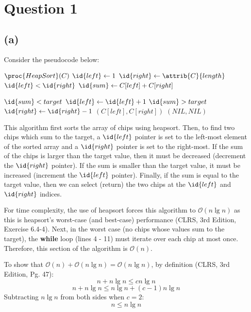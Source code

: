 \section{Question 1}
    \subsection{(a)}
    Consider the pseudocode below:
    \begin{spacing}{1.2}
    \begin{codebox}
        \li $\proc{HeapSort}(C)$
        \li $\id{left} \gets 1$
        \li $\id{right} \gets \attrib{C}{length}$
        \li \While $\id{left} < \id{right}$
            \Do
                \li $\id{sum} \gets C[left] + C[right]$

                \li \If $\id{sum} < target$
                \Then
                    \li $\id{left} \gets \id{left} + 1$
                \li \ElseIf $\id{sum} > target$
                \Then
                    \li $\id{right} \gets \id{right} - 1$
                \li \ElseNoIf
                    \li \Return $(C[left], C[right])$
                \End 
            \End
        \li \Return $(NIL, NIL)$
    \end{codebox}
    \end{spacing}
    \vspace{5mm}
    This algorithm first sorts the array of chips using heapsort. 
    Then, to find two chips which sum to the target, a $\id{left}$ pointer is set to the left-most element of the sorted array and a $\id{right}$ pointer is set to the right-most.
    If the sum of the chips is larger than the target value, then it must be decreased (decrement the $\id{right}$ pointer).
    If the sum is smaller than the target value, it must be increased (increment the $\id{left}$ pointer).
    Finally, if the sum is equal to the target value, then we can select (return) the two chips at the $\id{left}$ and $\id{right}$ indices.

    For time complexity, the use of heapsort forces this algorithm to $\mathcal{O}(n\lg{n})$ as this is heapsort's worst-case (and best-case) performance (CLRS, 3rd Edition, Exercise 6.4-4).
    Next, in the worst case (no chips whose values sum to the target), the \textbf{while} loop (lines 4 - 11) must iterate over each chip at most once.
    Therefore, this section of the algorithm is $\mathcal{O}(n)$.

    To show that $\mathcal{O}(n) + \mathcal{O}(n\lg{n}) = \mathcal{O}(n\lg{n})$, by definition (CLRS, 3rd Edition, Pg. 47):
    \[n + n\lg{n} \le cn\lg{n}\]
    \[n + n\lg{n} \le n\lg{n} + (c-1)n\lg{n}\]
    Subtracting $n\lg{n}$ from both sides when $c = 2$:
    \[n \le n\lg{n}\]

